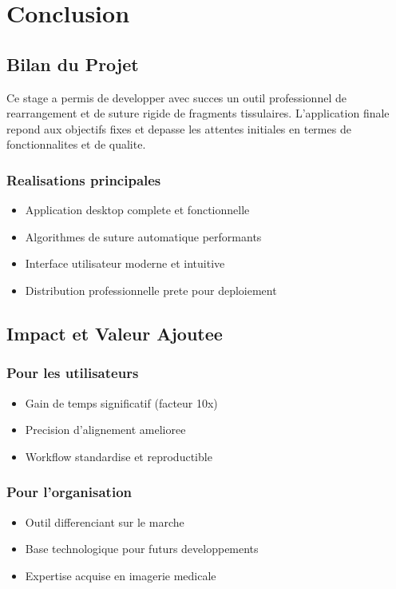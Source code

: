 \documentclass[12pt,a4paper]{article}
\begin{document}
\section{Conclusion}

\subsection{Bilan du Projet}

Ce stage a permis de developper avec succes un outil professionnel de rearrangement et de suture rigide de fragments tissulaires. L'application finale repond aux objectifs fixes et depasse les attentes initiales en termes de fonctionnalites et de qualite.

\subsubsection{Realisations principales}
\begin{itemize}
\item Application desktop complete et fonctionnelle
\item Algorithmes de suture automatique performants
\item Interface utilisateur moderne et intuitive
\item Distribution professionnelle prete pour deploiement
\end{itemize}

\subsection{Impact et Valeur Ajoutee}

\subsubsection{Pour les utilisateurs}
\begin{itemize}
\item Gain de temps significatif (facteur 10x)
\item Precision d'alignement amelioree
\item Workflow standardise et reproductible
\end{itemize}

\subsubsection{Pour l'organisation}
\begin{itemize}
\item Outil differenciant sur le marche
\item Base technologique pour futurs developpements
\item Expertise acquise en imagerie medicale
\end{itemize}
\end{document}
